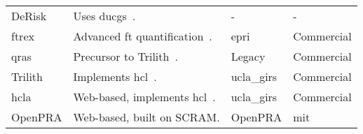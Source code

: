 \begin{table}[ht!]
\begin{tabular}{@{}llll@{}}
DeRisk &
  Uses \acrlong{ducg}s~\cite{derisk1,derisk2}. &
  - &
  - \\
\acrshort{ftrex} &
  Advanced \acrlong{ft} quantification~\cite{ftrex_manual}. &
  \acrshort{epri} &
  Commercial \\
\acrshort{qras} &
  Precursor to Trilith~\cite{qras}. &
  Legacy &
  Commercial \\
Trilith &
  Implements \acrfull{hcl}~\cite{hcl_method}. &
  \acrshort{ucla_girs} &
  Commercial \\
\acrshort{hcla} &
  Web-based, implements \acrshort{hcl}~\cite{hcla_cmd,hcla_web}. &
  \acrshort{ucla_girs} &
  Commercial \\
OpenPRA &
  Web-based, built on SCRAM.&
  OpenPRA &
  \acrshort{mit} \\
\end{tabular}
\end{table}